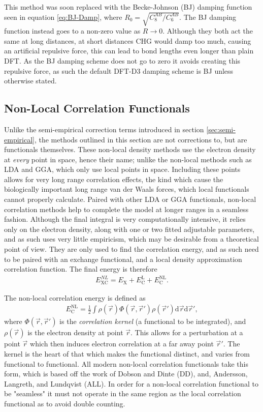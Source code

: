 \documentclass[10pt,a4paper,twocolumn,twoside]{extarticle}
\renewcommand{\d}{\text{d}}
\begin{document}
	This method was soon replaced with the Becke-Johnson (BJ) damping function\cite{BJ-Damp} seen in equation \ref{eq:BJ-Damp}, where $R_0 = \sqrt{C_8^{AB}/C_6^{AB}}$. The BJ damping function instead goes to a non-zero value as $R \rightarrow 0$. Although they both act the same at long distances, at short distances CHG would damp too much, causing an artificial repulsive force, this can lead to bond lengths even longer than plain DFT. As the BJ damping scheme does not go to zero it avoids creating this repulsive force, as such the default DFT-D3 damping scheme is BJ unless otherwise stated.\cite{D3-Damp}

	\subsection{Non-Local Correlation Functionals}
	\label{sec:NL}
	Unlike the semi-empirical correction terms introduced in section \ref{sec:semi-empirical}, the methods outlined in this section are not corrections to, but are functionals themselves. These non-local density methods use the electron density at \emph{every} point in space, hence their name; unlike the non-local methods such as LDA and GGA, which only use local points in space. Including these points allows for very long range correlation effects, the kind which cause the biologically important long range van der Waals forces, which local functionals cannot properly calculate. Paired with other LDA or GGA functionals, non-local correlation methods help to complete the model at longer ranges in a seamless fashion. Although the final integral is very computationally intensive, it relies only on the electron density, along with one or two fitted adjustable parameters, and as such uses very little empiricism, which may be desirable from a theoretical point of view. They are only used to find the correlation energy, and as such need to be paired with an exchange functional, and a local density approximation correlation function. The final energy is therefore
	\begin{align}
		E_\text{XC}^{NL} = E_\text{X} + E_\text{C}^\text{L} + E_\text{C}^\text{NL}.
	\end{align} 

	The non-local correlation energy is defined as
	\begin{align}
		E^\text{NL}_\text{C} = \frac{1}{2} \int  \rho(\vec{r}) \Phi(\vec{r}, \vec{r}') \rho(\vec{r}') \d\vec{r} \d\vec{r}',
	\end{align}
	where $\Phi(\vec{r}, \vec{r}')$ is the \emph{correlation kernel} (a functional to be integrated), and $\rho(\vec{r})$ is the electron density at point $\vec{r}$. This allows for a perturbation at a point $\vec{r}$ which then induces electron correlation at a far away point $\vec{r}'$. The kernel is the heart of that which makes the functional distinct, and varies from functional to functional. All modern non-local correlation functionals take this form, which is based off the work of Dobson and Dinte (DD)\cite{DD}, and, Andersson, Langreth, and Lundqvist (ALL)\cite{ALL}.
	In order for a non-local correlation functional to be "seamless" it must not operate in the same region as the local correlation functional as to avoid double counting. 
\end{document}
